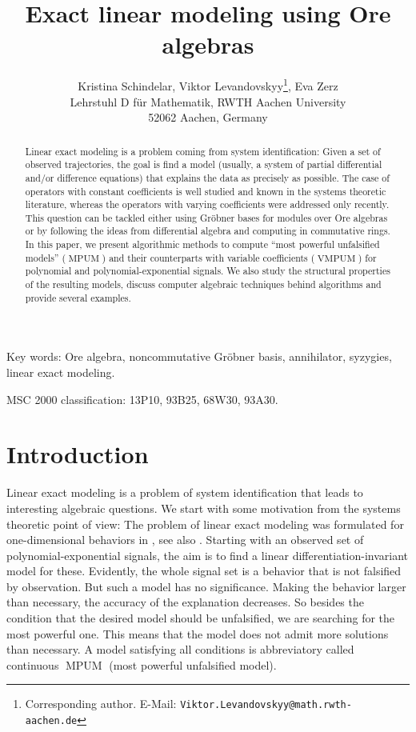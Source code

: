 \documentclass[a4paper,10pt]{article}
\date{}
\title{Exact linear modeling using Ore algebras}
\author{Kristina Schindelar, Viktor Levandovskyy\footnote{Corresponding author. E-Mail: {\tt Viktor.Levandovskyy@math.rwth-aachen.de}}, Eva Zerz\\
Lehrstuhl D f\"ur Mathematik, RWTH Aachen University \\ 52062 Aachen, Germany}
\theoremstyle{nonumberplain}
\DeclareMathOperator{\MPUM}{MPUM}
\DeclareMathOperator{\VMPUM}{VMPUM}
\begin{document}
\maketitle

\begin{abstract}
Linear exact modeling is a problem coming from system identification:
Given a set of observed trajectories, the goal is find a model (usually,
a system of partial differential and/or difference equations)
that explains the data as precisely as possible.
The case of operators with constant coefficients is well studied and known
in the systems theoretic literature, whereas the operators
with varying coefficients were addressed only recently.
This question can be tackled either using Gr\"obner bases for
modules over Ore algebras or by following the ideas from
differential algebra and computing in commutative rings. 
In this paper, we present algorithmic methods to compute ``most powerful
unfalsified models'' ($\MPUM$) and their counterparts with
variable coefficients ($\VMPUM$) for polynomial and
polynomial-exponential signals.  
We also study the structural properties of the
resulting models, discuss computer algebraic techniques behind algorithms
and provide several examples.
\end{abstract}

Key words: Ore algebra, noncommutative Gr\"obner basis, annihilator,
syzygies, linear exact modeling.

MSC 2000 classification: 13P10, 93B25, 68W30, 93A30.

\tableofcontents 

\section{Introduction}
Linear exact modeling is a problem of system identification that leads
to interesting algebraic questions. We start with some motivation
from the systems theoretic point of view:
The problem of linear exact modeling was formulated for one-dimensional 
behaviors in \cite{AW}, see also \cite{KP1,KP2}. Starting with an observed set of 
polynomial-exponential signals, the aim is to find a linear 
differentiation-invariant model for these.
Evidently, the whole signal set is a behavior that is not falsified by 
observation. But such a model has no significance. Making the behavior 
larger than necessary, the accuracy of the explanation decreases. 
So besides the condition that the desired model should be unfalsified, 
we are searching for the most powerful one. This means that the model 
does not admit more solutions than necessary. A model satisfying all 
conditions is abbreviatory called continuous $\MPUM$ 
(most powerful unfalsified model).
\end{document}
